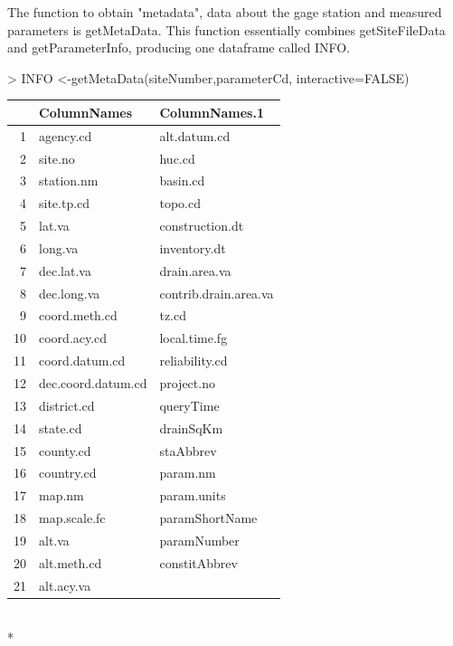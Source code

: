 \documentclass[a4paper,11pt]{article}
\begin{document}
The function to obtain "metadata", data about the gage station and measured parameters is getMetaData. This function essentially combines getSiteFileData and getParameterInfo, producing one dataframe called INFO.

\begin{Schunk}
\begin{Sinput}
> INFO <-getMetaData(siteNumber,parameterCd, interactive=FALSE)
\end{Sinput}
\end{Schunk}

\begin{tabular}{rll}
  \hline
 & ColumnNames & ColumnNames.1 \\ 
  \hline
1 & agency.cd & alt.datum.cd \\ 
  2 & site.no & huc.cd \\ 
  3 & station.nm & basin.cd \\ 
  4 & site.tp.cd & topo.cd \\ 
  5 & lat.va & construction.dt \\ 
  6 & long.va & inventory.dt \\ 
  7 & dec.lat.va & drain.area.va \\ 
  8 & dec.long.va & contrib.drain.area.va \\ 
  9 & coord.meth.cd & tz.cd \\ 
  10 & coord.acy.cd & local.time.fg \\ 
  11 & coord.datum.cd & reliability.cd \\ 
  12 & dec.coord.datum.cd & project.no \\ 
  13 & district.cd & queryTime \\ 
  14 & state.cd & drainSqKm \\ 
  15 & county.cd & staAbbrev \\ 
  16 & country.cd & param.nm \\ 
  17 & map.nm & param.units \\ 
  18 & map.scale.fc & paramShortName \\ 
  19 & alt.va & paramNumber \\ 
  20 & alt.meth.cd & constitAbbrev \\ 
  21 & alt.acy.va &  \\ 
   \hline
\end{tabular}
\\*
\end{document}
